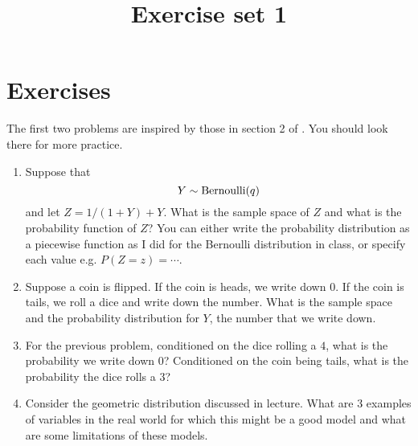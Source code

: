 



\title{Exercise set 1}

\maketitle






\section{Exercises}





\begin{exercise}
The first two problems are inspired by those in section 2 of \cite{tabak}.   You should look there for more practice. 
\begin{enumerate}[label=(\alph*)]
\item Suppose that 
\begin{equation*}
Y \sim {\rm Bernoulli}(q)
\end{equation*}
and let $Z = 1/(1+Y) + Y$. What is the sample space of $Z$ and what is the probability function of $Z$? You can either write the probability distribution as a piecewise function as I did for the Bernoulli distribution in class, or specify each value e.g. $P(Z=z) = \cdots$.
\item Suppose a coin is flipped. If the coin is heads, we write down $0$. If the coin is tails, we roll a dice and write down the number. What is the sample space and the probability distribution for $Y$, the number that we write down. 
\item For the previous problem, conditioned on the dice rolling a $4$, what is the probability we write down $0$? Conditioned on the coin being tails, what is the probability the dice rolls a $3$?
\item Consider the geometric distribution discussed in lecture. What are 3 examples of variables in the real world for which this might be a good model and what are some limitations of these models. 
\end{enumerate}
\end{exercise}




